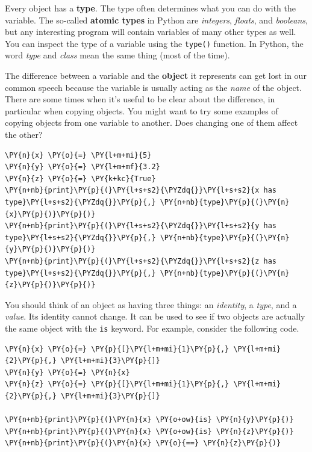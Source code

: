 Every object has a \textbf{type}.  The type often determines what you can do with the variable.  The so-called \textbf{atomic types} in Python are \emph{integers}, \emph{floats}, and \emph{booleans}, but any interesting program will contain variables of many other types as well.  You can inspect the type of a variable using the \texttt{type()} function.  In Python, the word \emph{type} and \emph{class} mean the same thing (most of the time).


The difference between a variable and the \textbf{object} it represents can get lost in our common speech because the variable is usually acting as the \emph{name} of the object.  There are some times when it's useful to be clear about the difference, in particular when copying objects.  You might want to try some examples of copying objects from one variable to another.  Does changing one of them affect the other?

\begin{Verbatim}[commandchars=\\\{\}]
\PY{n}{x} \PY{o}{=} \PY{l+m+mi}{5}
\PY{n}{y} \PY{o}{=} \PY{l+m+mf}{3.2}
\PY{n}{z} \PY{o}{=} \PY{k+kc}{True}
\PY{n+nb}{print}\PY{p}{(}\PY{l+s+s2}{\PYZdq{}}\PY{l+s+s2}{x has type}\PY{l+s+s2}{\PYZdq{}}\PY{p}{,} \PY{n+nb}{type}\PY{p}{(}\PY{n}{x}\PY{p}{)}\PY{p}{)}
\PY{n+nb}{print}\PY{p}{(}\PY{l+s+s2}{\PYZdq{}}\PY{l+s+s2}{y has type}\PY{l+s+s2}{\PYZdq{}}\PY{p}{,} \PY{n+nb}{type}\PY{p}{(}\PY{n}{y}\PY{p}{)}\PY{p}{)}
\PY{n+nb}{print}\PY{p}{(}\PY{l+s+s2}{\PYZdq{}}\PY{l+s+s2}{z has type}\PY{l+s+s2}{\PYZdq{}}\PY{p}{,} \PY{n+nb}{type}\PY{p}{(}\PY{n}{z}\PY{p}{)}\PY{p}{)}
\end{Verbatim}



You should think of an object as having three things: an \emph{identity}, a \emph{type}, and a \emph{value}.
Its identity cannot change.  It can be used to see if two objects are actually the same object with the \texttt{is} keyword.
For example, consider the following code.

\begin{Verbatim}[commandchars=\\\{\}]
\PY{n}{x} \PY{o}{=} \PY{p}{[}\PY{l+m+mi}{1}\PY{p}{,} \PY{l+m+mi}{2}\PY{p}{,} \PY{l+m+mi}{3}\PY{p}{]}
\PY{n}{y} \PY{o}{=} \PY{n}{x}
\PY{n}{z} \PY{o}{=} \PY{p}{[}\PY{l+m+mi}{1}\PY{p}{,} \PY{l+m+mi}{2}\PY{p}{,} \PY{l+m+mi}{3}\PY{p}{]}

\PY{n+nb}{print}\PY{p}{(}\PY{n}{x} \PY{o+ow}{is} \PY{n}{y}\PY{p}{)}
\PY{n+nb}{print}\PY{p}{(}\PY{n}{x} \PY{o+ow}{is} \PY{n}{z}\PY{p}{)}
\PY{n+nb}{print}\PY{p}{(}\PY{n}{x} \PY{o}{==} \PY{n}{z}\PY{p}{)}
\end{Verbatim}



